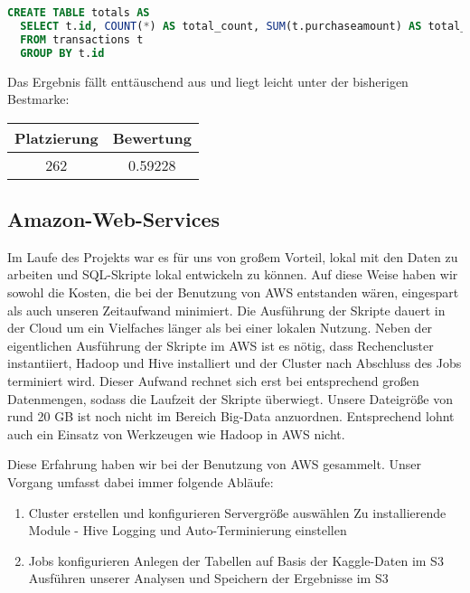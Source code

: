 \begin{lstlisting}[language=SQL]
CREATE TABLE totals AS
  SELECT t.id, COUNT(*) AS total_count, SUM(t.purchaseamount) AS total_spent
  FROM transactions t
  GROUP BY t.id
\end{lstlisting}

Das Ergebnis fällt enttäuschend aus und liegt leicht unter der bisherigen Bestmarke:
\begin{tabular}{|c|c|}
	\hline \textbf{Platzierung} & \textbf{Bewertung} \\ 
	\hline 262 & 0.59228  \\ 
	\hline 
\end{tabular}

\subsection{Amazon-Web-Services}
Im Laufe des Projekts war es für uns von großem Vorteil, lokal mit den Daten zu arbeiten und SQL-Skripte lokal entwickeln zu können. Auf diese Weise haben wir sowohl die Kosten, die bei der Benutzung von AWS entstanden wären, eingespart als auch unseren Zeitaufwand minimiert. Die Ausführung der Skripte dauert in der Cloud um ein Vielfaches länger als bei einer lokalen Nutzung. Neben der eigentlichen Ausführung der Skripte im AWS ist es nötig, dass Rechencluster instantiiert, Hadoop und Hive installiert und der Cluster nach Abschluss des Jobs terminiert wird. Dieser Aufwand rechnet sich erst bei entsprechend großen Datenmengen, sodass die Laufzeit der Skripte überwiegt. Unsere Dateigröße von rund 20 GB ist noch nicht im Bereich Big-Data anzuordnen. Entsprechend lohnt auch ein Einsatz von Werkzeugen wie Hadoop in AWS nicht.

Diese Erfahrung haben wir bei der Benutzung von AWS gesammelt. Unser Vorgang umfasst dabei immer folgende Abläufe:
\begin{enumerate}
\item Cluster erstellen und konfigurieren
\subitem Servergröße auswählen
\subitem Zu installierende Module - Hive
\subitem Logging und Auto-Terminierung einstellen
\item Jobs konfigurieren
\subitem Anlegen der Tabellen auf Basis der Kaggle-Daten im S3
\subitem Ausführen unserer Analysen und Speichern der Ergebnisse im S3
\end{enumerate}

